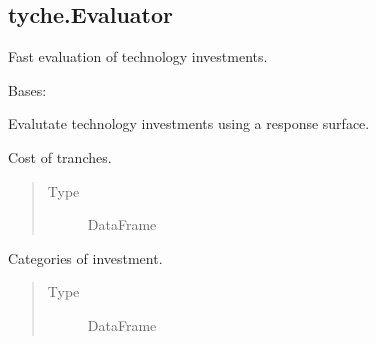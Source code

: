 \documentclass[letterpaper,10pt,english]{sphinxmanual}
\begin{document}
\subsection{tyche.Evaluator}
\label{\detokenize{tyche:module-tyche.Evaluator}}\label{\detokenize{tyche:tyche-evaluator}}
Fast evaluation of technology investments.

\begin{fulllineitems}
\label{\detokenize{tyche:tyche.Evaluator.Evaluator}}
Bases: 

Evalutate technology investments using a response surface.

\begin{fulllineitems}
\label{\detokenize{tyche:tyche.Evaluator.Evaluator.amounts}}
Cost of tranches.
\begin{quote}\begin{description}
\item[{Type}] \leavevmode
DataFrame

\end{description}\end{quote}

\end{fulllineitems}


\begin{fulllineitems}
\label{\detokenize{tyche:tyche.Evaluator.Evaluator.categories}}
Categories of investment.
\begin{quote}\begin{description}
\item[{Type}] \leavevmode
DataFrame

\end{description}\end{quote}

\end{fulllineitems}


\end{fulllineitems}
\end{document}
